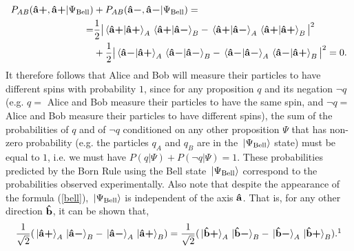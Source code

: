 {\begin{equation*}
\begin{split}
    P_{AB}(\uvbp{a}, \uvbp{a}|\Psi_{\text{Bell}})&+P_{AB}(\uvbm{a}, \uvbm{a}|\Psi_{\text{Bell}})= \\
    =&\frac{1}{2}\big| \ip*{\uvbp{a}}{\uvbp{a}}_A\ip*{\uvbp{a}}{\uvbm{a}}_B-\ip*{\uvbp{a}}{\uvbm{a}}_A\ip*{\uvbp{a}}{\uvbp{a}}_B\big|^2\\
    &+\frac{1}{2}\big|\ip*{\uvbm{a}}{\uvbp{a}}_A\ip*{\uvbm{a}}{\uvbm{a}}_B-\ip*{\uvbm{a}}{\uvbm{a}}_A\ip*{\uvbm{a}}{\uvbp{a}}_B\big|^2=0.
\end{split}
\end{equation*}
It therefore follows that Alice and Bob will measure their particles to have different spins with probability $1$, since for any proposition $q$ and its negation $\neg q$ (e.g. $q =$ Alice and Bob measure their particles to have the same spin, and $\neg q = $ Alice and Bob measure their particles to have different spins), the sum of the probabilities of $q$ and of $\neg q$ conditioned on any other proposition $\Psi$ that has non-zero probability (e.g. the particles $q_A$ and $q_B$ are in the $\ket*{\Psi_{\text{Bell}}}$ state) must be equal to $1$, i.e. we must have $P(q|\Psi)+P(\neg q|\Psi)=1.$} 
These probabilities predicted by the Born Rule using the Bell state $\ket*{\Psi_{\text{Bell}}}$ correspond to the probabilities observed experimentally. Also note that despite the appearance of the formula (\ref{bell}), $\ket*{\Psi_{\text{Bell}}}$ is independent of the axis $\vb{\hat{{a}}}$. That is, for any other direction $\vb{\hat{{b}}}$, it can be shown that,
\begin{equation}\label{bellstate2}\frac{1}{\sqrt{2}}(\ket*{\uvbp{a}}_A\ket*{\uvbm{a}}_B-\ket*{\uvbm{a}}_A\ket*{\uvbp{a}}_B)=\frac{1}{\sqrt{2}}(\ket*{\uvbp{b}}_A\ket*{\uvbm{b}}_B-\ket*{\uvbm{b}}_A\ket*{\uvbp{b}}_B).\protect\footnotemark\end{equation}
